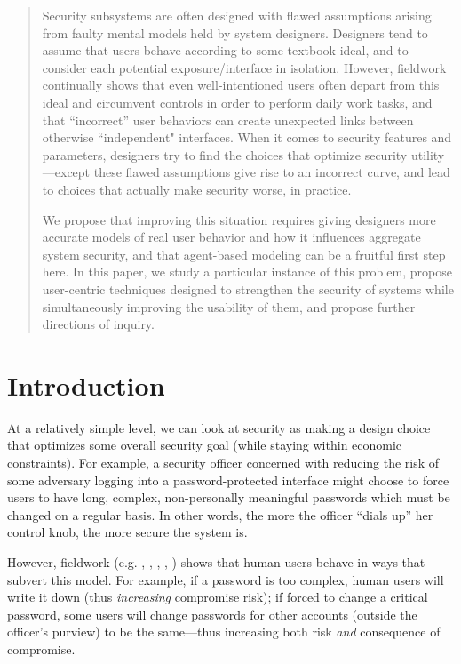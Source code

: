 \documentclass{acm_proc_article-sp}
\begin{document}
\begin{abstract}
Security subsystems are often designed with flawed assumptions arising from faulty
mental models held by system designers. 
Designers tend to assume that users behave according to some textbook ideal,
and to consider each potential exposure/interface in isolation.
However, fieldwork 
continually shows that even well-intentioned users often depart from this ideal
and circumvent controls in order to perform daily work tasks, and
that ``incorrect'' user behaviors can create unexpected links between 
otherwise ``independent" interfaces.
When it comes to security features and parameters,
designers try to find the choices that optimize security utility---except
these flawed assumptions give rise to an incorrect curve, and lead
to choices that actually make security worse, in practice.

We propose that improving this situation requires giving designers more
accurate models of real user behavior and how it influences aggregate system
security, and that agent-based modeling can be a fruitful 
first step here.
In this paper, we study a
particular instance of this problem, propose
user-centric techniques designed to strengthen the security of systems
while simultaneously improving the usability of them, and propose
further directions of inquiry.
\end{abstract}

\section{Introduction}

At a relatively simple level, we can look at security as
making a design choice that optimizes some overall security goal (while staying within economic constraints).   For example,
a security officer concerned with reducing the risk of some adversary
logging into a password-protected interface might choose to force users
to have long, complex, non-personally meaningful passwords which must be changed on a regular basis.  In other words, the more the officer ``dials up'' her control knob, the more secure the system is.     

However, fieldwork (e.g. \cite{blythe2013circumvention}, \cite{DP00},
\cite{florencio2007large}, \cite{gaw2006password},
\cite{riley2006password}) shows that human users behave in ways that
subvert this model.  For example, if a password is too complex, human
users will write it down (thus {\em increasing} compromise risk); if
forced to change a critical password, some users will change passwords
for other accounts (outside the officer's purview) to be the
same---thus increasing both risk {\em and} consequence of compromise.
\end{document}
